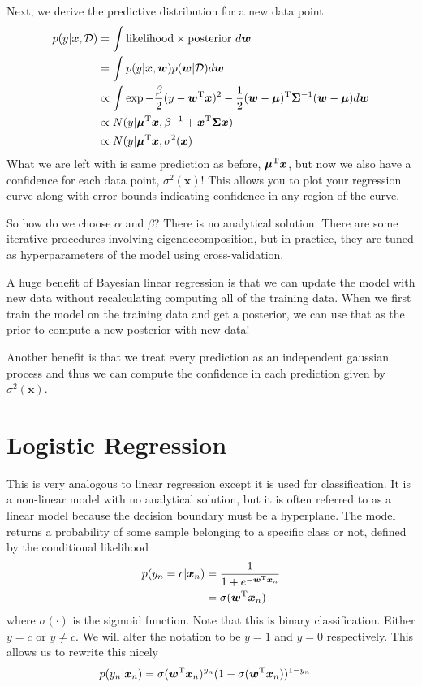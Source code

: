 \documentclass[11pt]{article}
\newcommand{\vct}[1]{\boldsymbol{#1}} %
\newcommand{\mat}[1]{\boldsymbol{#1}} %
\newcommand{\T}{^{\textrm T}} %
\begin{document}
Next, we derive the predictive distribution for a new data point
\begin{align*}
p(y|\vct{x}, \mathcal{D}) &= \int \text{likelihood} \times \text{posterior } d\vct{w}\\
&= \int p(y|\vct{x}, \vct{w}) p(\vct{w}|\mathcal{D})d\vct{w}\\
&\propto \int \exp{-\frac{\beta}{2}(y - \vct{w}\T\vct{x})^2 - \frac{1}{2}(\vct{w} - \vct{\mu})\T \mat{\Sigma}^{-1}(\vct{w} - \vct{\mu})}d\vct{w}\\
 &\propto N(y|\vct{\mu}\T\vct{x}, \beta^{-1} + \vct{x}\T\mat{\Sigma}\vct{x}) \\
 &\propto N(y|\vct{\mu}\T\vct{x},\sigma^2(\vct{x})
 \end{align*}
What we are left with is same prediction as before, $\vct{\mu}\T\vct{x}$, but now we also have a confidence for each data point, $\sigma^2(\vct{x})$! This allows you to plot your regression curve along with error bounds indicating confidence in any region of the curve.

So how do we choose $\alpha$ and $\beta$? There is no analytical solution. There are some iterative procedures involving eigendecomposition, but in practice, they are tuned as hyperparameters of the model using cross-validation.

A huge benefit of Bayesian linear regression is that we can update the model with new data without recalculating computing all of the training data. When we first train the model on the training data and get a posterior, we can use that as the prior to compute a new posterior with new data!

Another benefit is that we treat every prediction as an independent gaussian process and thus we can compute the confidence in each prediction given by $\sigma^2(\vct{x})$.

\section{Logistic Regression}
This is very analogous to linear regression except it is used for classification. It is a non-linear model with no analytical solution, but it is often referred to as a linear model because the decision boundary must be a hyperplane. The model returns a probability of some sample belonging to a specific class or not, defined by the conditional likelihood
\begin{align*}
p(y_n=c|\vct{x}_n) &= \frac{1}{1+e^{-\vct{w}\T\vct{x}_n}}\\
&= \sigma(\vct{w}\T\vct{x}_n)
\end{align*}
where $\sigma(\cdot)$ is the sigmoid function. Note that this is binary classification. Either $y=c$ or $y\ne c$. We will alter the notation to be $y=1$ and $y=0$ respectively. This allows us to rewrite this nicely
\begin{align*}
p(y_n|\vct{x}_n) &= \sigma(\vct{w}\T\vct{x}_n)^{y_n}(1-\sigma(\vct{w}\T\vct{x}_n))^{1-y_n}
\end{align*}
\end{document}
